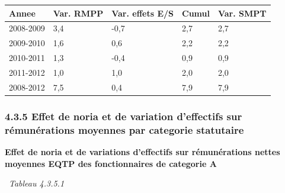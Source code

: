 \begin{longtable}[]{@{}lllll@{}}
\toprule
Annee & Var. RMPP & Var. effets E/S & Cumul & Var. SMPT\tabularnewline
\midrule
\endhead
2008-2009 & 3,4 & -0,7 & 2,7 & 2,7\tabularnewline
2009-2010 & 1,6 & 0,6 & 2,2 & 2,2\tabularnewline
2010-2011 & 1,3 & -0,4 & 0,9 & 0,9\tabularnewline
2011-2012 & 1,0 & 1,0 & 2,0 & 2,0\tabularnewline
2008-2012 & 7,5 & 0,4 & 7,9 & 7,9\tabularnewline
\bottomrule
\end{longtable}

\hypertarget{effet-de-noria-et-de-variation-deffectifs-sur-remunerations-moyennes-par-categorie-statutaire}{%
\subsubsection{4.3.5 Effet de noria et de variation d'effectifs sur
rémunérations moyennes par categorie
statutaire}\label{effet-de-noria-et-de-variation-deffectifs-sur-remunerations-moyennes-par-categorie-statutaire}}

\textbf{Effet de noria et de variations d'effectifs sur rémunérations
nettes moyennes EQTP des fonctionnaires de categorie A}

~\emph{Tableau 4.3.5.1}

